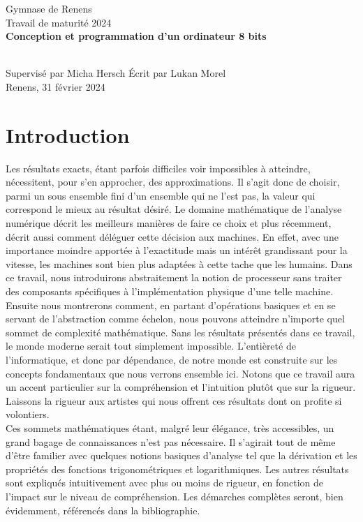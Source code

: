 \documentclass{article}
\begin{document}
\begin{titlepage}
\begin{center}
    \LARGE
    Gymnase de Renens
    \vspace{2cm} \ \\
    Travail de maturité 2024
    \vspace{5cm} \ \\
    \Huge
    \textbf{Conception et programmation d'un ordinateur 8 bits}
\end{center}
\Large
\vspace{5cm} \ \\
Supervisé par Micha Hersch
\hfill
Écrit par Lukan Morel
\vspace{2cm} \ \\
Renens, 31 février 2024
\end{titlepage}
\pagebreak
{}
\pagestyle{fancy}
\cfoot{}
\tableofcontents
\newpage
\section{Introduction}
Les résultats exacts, étant parfois difficiles voir impossibles à atteindre, nécessitent, pour s'en approcher, des approximations. 
Il s'agit donc de choisir, parmi un sous ensemble fini d'un ensemble qui ne l'est pas, la valeur qui correspond le mieux au résultat désiré. Le domaine mathématique de l'analyse numérique décrit les meilleurs manières de faire ce choix et plus récemment, décrit aussi comment déléguer cette décision aux machines. En effet, avec une importance moindre apportée à l'exactitude mais un intérêt grandissant pour la vitesse, les machines sont bien plus adaptées à cette tache que les humains.
Dans ce travail, nous introduirons abstraitement la notion de processeur sans traiter des composants spécifiques à l'implémentation physique d'une telle machine. 
Ensuite nous montrerons comment, en partant d'opérations basiques et en se servant de l'abstraction comme échelon, nous pouvons atteindre n'importe quel sommet de complexité mathématique. Sans les résultats présentés dans ce travail, le monde moderne serait tout simplement impossible. L'entièreté de l'informatique, et donc par dépendance, de notre monde est construite sur les concepts fondamentaux que nous verrons ensemble ici. Notons que ce travail aura un accent particulier sur la compréhension et l'intuition plutôt que sur la rigueur. Laissons la rigueur aux artistes qui nous offrent ces résultats dont on profite si volontiers.\\
Ces sommets mathématiques étant, malgré leur élégance, très accessibles, un grand bagage de connaissances n'est pas nécessaire. Il s'agirait tout de même d'être familier avec quelques notions basiques d'analyse tel que la dérivation et les propriétés des fonctions trigonométriques et logarithmiques. Les autres résultats sont expliqués intuitivement avec plus ou moins de rigueur, en fonction de l'impact sur le niveau de compréhension. Les démarches complètes seront, bien évidemment, référencés dans la bibliographie.
\end{document}
